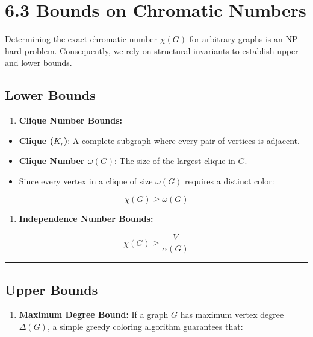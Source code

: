 \documentclass[
]{book}
\providecommand{\tightlist}{%
  \setlength{\itemsep}{0pt}\setlength{\parskip}{0pt}}
\theoremstyle{definition}
\theoremstyle{definition}
\theoremstyle{definition}
\theoremstyle{definition}
\theoremstyle{remark}
\begin{document}
\section{6.3 Bounds on Chromatic Numbers}\label{bounds-on-chromatic-numbers}

Determining the exact chromatic number \(\chi(G)\) for arbitrary graphs is an NP-hard problem. Consequently, we rely on structural invariants to establish upper and lower bounds.

\subsection{Lower Bounds}\label{lower-bounds}

\begin{enumerate}
\def\labelenumi{\arabic{enumi}.}
\tightlist
\item
  \textbf{Clique Number Bounds:}
\end{enumerate}

\begin{itemize}
\tightlist
\item
  \textbf{Clique (\(K_r\))}: A complete subgraph where every pair of vertices is adjacent.
\item
  \textbf{Clique Number \(\omega(G)\)}: The size of the largest clique in \(G\).
\item
  Since every vertex in a clique of size \(\omega(G)\) requires a distinct color:
\end{itemize}

\[\chi(G) \ge \omega(G)\]

\begin{enumerate}
\def\labelenumi{\arabic{enumi}.}
\setcounter{enumi}{1}
\tightlist
\item
  \textbf{Independence Number Bounds:}
\end{enumerate}

\[\chi(G) \ge \frac{\vert{}V\vert{}}{\alpha(G)}\]

\begin{center}\rule{0.5\linewidth}{0.5pt}\end{center}

\subsection{Upper Bounds}\label{upper-bounds}

\begin{enumerate}
\def\labelenumi{\arabic{enumi}.}
\tightlist
\item
  \textbf{Maximum Degree Bound:}
  If a graph \(G\) has maximum vertex degree \(\Delta(G)\), a simple greedy coloring algorithm guarantees that:
\end{enumerate}
\end{document}
